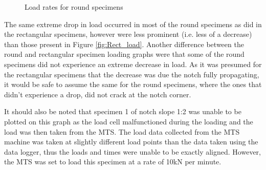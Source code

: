 \documentclass[11pt,a4paper]{article}
\numberwithin{equation}{subsection}
\begin{document}
\vspace*{\baselineskip}

\begin{figure}[h]
	\begin{center}
	\end{center}
	\caption{Load rates for round specimens}
	\label{fig:Round_load}
\end{figure}

\noindent
The same extreme drop in load occurred in most of the round specimens as did in the rectangular specimens, however were less prominent (i.e. less of a decrease) than those present in Figure \ref{fig:Rect_load}. Another difference between the round and rectangular specimen loading graphs were that some of the round specimens did not experience an extreme decrease in load. As it was presumed for the rectangular specimens that the decrease was due the notch fully propagating, it would be safe to assume the same for the round specimens, where the ones that didn't experience a drop, did not crack at the notch corner. 

\vspace*{\baselineskip}

\noindent
It should also be noted that specimen 1 of notch slope 1:2 was unable to be plotted on this graph as the load cell malfunctioned during the loading and the load was then taken from the MTS. The load data collected from the MTS machine was taken at slightly different load points than the data taken using the data logger, thus the loads and times were unable to be exactly aligned. However, the MTS was set to load this specimen at a rate of 10kN per minute.  
\end{document}
